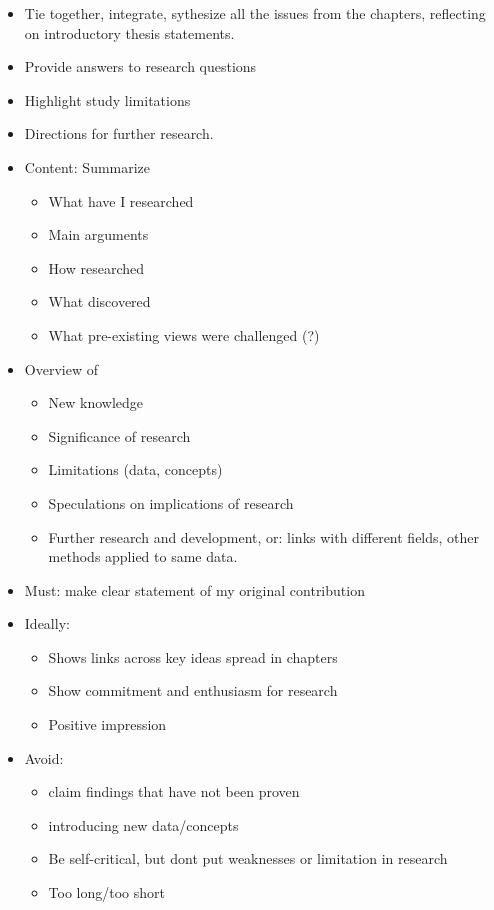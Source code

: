 \begin{itemize}
  \item Tie together, integrate, sythesize all the issues from the chapters, reflecting on introductory thesis statements.
  \item Provide answers to research questions
  \item Highlight study limitations
  \item Directions for further research.
  \item Content: Summarize
  \begin{itemize}
    \item What have I researched
    \item Main arguments
    \item How researched
    \item What discovered
    \item What pre-existing views were challenged (?)
  \end{itemize}
  \item Overview of
  \begin{itemize}
    \item New knowledge
    \item Significance of research
    \item Limitations (data, concepts)
    \item Speculations on implications of research
    \item Further research and development, or: links with different fields, other methods applied to same data.
  \end{itemize}
  \item Must: make clear statement of my original contribution
  \item Ideally:
  \begin{itemize}
    \item Shows links across key ideas spread in chapters
    \item Show commitment and enthusiasm for research
    \item Positive impression
  \end{itemize}
  \item Avoid:
  \begin{itemize}
    \item claim findings that have not been proven
    \item introducing new data/concepts
    \item Be self-critical, but dont put weaknesses or limitation in research
    \item Too long/too short
  \end{itemize}
\end{itemize}


